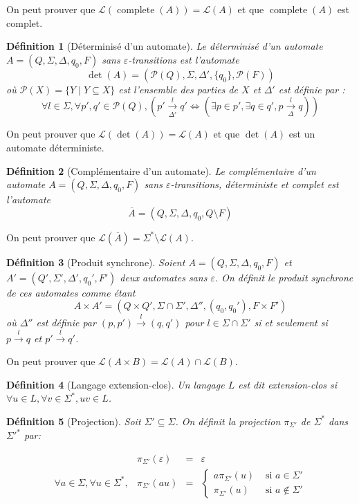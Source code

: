 \documentclass[conference]{IEEEtran}
\newtheorem{mydef}{D\'efinition}
\begin{document}
On peut prouver que $\mathcal L(\operatorname{complete}(A)) = \mathcal L(A)$ et que $\operatorname{complete}(A)$ est complet.

\begin{mydef}[D\'eterminis\'e d'un automate]
Le d\'eterminis\'e d'un automate $A = (Q, \Sigma, \Delta, q_0, F)$ sans $\varepsilon$-transitions est l'automate $$\det(A) = (\mathcal P(Q), \Sigma, \Delta', \{q_0\}, \mathcal P(F))$$ o\`u $\mathcal P(X)=\{Y\mid Y \subseteq X\}$ est l'ensemble des parties de $X$ et $\Delta'$ est d\'efinie par :
$$\forall l \in \Sigma,\forall p',q' \in \mathcal P(Q), \left(p'\underset{\Delta'}{\overset{l}{{\to}}}q' \iff \left( \exists p \in p', \exists q \in q', p\underset{\Delta}{\overset{l}{{\to}}}q\right)\right)$$
\end{mydef}

On peut prouver que $\mathcal L(\det(A))=\mathcal L(A)$ et que $\det(A)$ est un automate d\'eterministe.

\begin{mydef}[Compl\'ementaire d'un automate]
Le compl\'ementaire d'un automate $A = (Q, \Sigma, \Delta, q_0, F)$ sans $\varepsilon$-transitions, d\'eterministe et complet est l'automate $$\overline{A} = (Q, \Sigma, \Delta, q_0, Q\setminus F)$$
\end{mydef}

On peut prouver que $\mathcal L\left(\overline{A}\right) = \Sigma^* \setminus \mathcal L(A)$.

\begin{mydef}[Produit synchrone]
Soient $A = (Q, \Sigma, \Delta, q_0, F)$ et $A' = (Q', \Sigma', \Delta', q_0', F')$ deux automates sans $\varepsilon$. On définit le produit synchrone de ces automates comme \'etant $$A\times A' = (Q \times Q', \Sigma \cap \Sigma', \Delta'', (q_0, q_0'), F\times F')$$ o\`u $\Delta''$ est d\'efinie par $(p,p')\overset{l}{{\to}}(q,q')$ pour $l\in \Sigma\cap \Sigma'$ si et seulement si $p\overset{l}{{\to}}q$ et $p'\overset{l}{{\to}}q'$.
\end{mydef}
On peut prouver que $\mathcal L(A\times B) = \mathcal L(A) \cap \mathcal L(B)$.

\begin{mydef}[Langage extension-clos]
Un langage $L$ est dit extension-clos si $\forall u \in L, \forall v \in \Sigma^*, uv \in L$.
\end{mydef}

\begin{mydef}[Projection]
Soit $\Sigma'\subseteq \Sigma$. On d\'efinit la projection $\pi_{\Sigma'}$ de $\Sigma^*$ dans $\Sigma'^*$ par:

$$\begin{array}{llll}
&\pi_{\Sigma'}(\varepsilon) &= &\varepsilon\\
\forall a \in \Sigma, \forall u \in \Sigma^*, &\pi_{\Sigma'}(au) &= &\left\{\begin{array}{ll}
a\pi_{\Sigma'}(u) &\text{ si } a \in \Sigma'\\
\pi_{\Sigma'}(u) &\text{ si } a \not\in \Sigma'
\end{array}\right.
\end{array}$$
\end{mydef}
\end{document}
